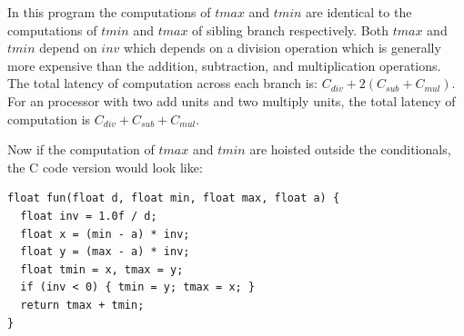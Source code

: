 \documentclass[sigplan,10pt,review,anonymous]{acmart}\settopmatter{printfolios=true,printccs=false,printacmref=false}
\begin{document}
In this program the computations of $tmax$ and $tmin$ are identical to the
computations of $tmin$ and $tmax$ of sibling branch respectively. Both $tmax$ and $tmin$
depend on $inv$ which depends on a division operation which is generally more
expensive than the addition, subtraction, and multiplication operations. The
total latency of computation across each branch is: $C_{div} + 2(C_{sub} + C_{mul})$.
For an \ooo{} processor with two add units and two multiply
units, the total latency of computation is $C_{div} + C_{sub} + C_{mul}$.

Now if the computation of $tmax$ and $tmin$ are hoisted outside the
conditionals, the C code version would look like:
\begin{lstlisting}
float fun(float d, float min, float max, float a) {
  float inv = 1.0f / d;
  float x = (min - a) * inv;
  float y = (max - a) * inv;
  float tmin = x, tmax = y;
  if (inv < 0) { tmin = y; tmax = x; }
  return tmax + tmin;
}
\end{lstlisting}
\end{document}
